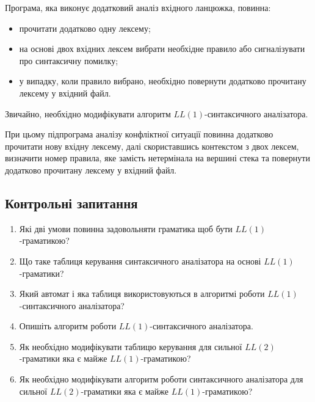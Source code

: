 Програма, яка виконує додатковий аналіз вхідного ланцюжка, повинна:
\begin{itemize}
	\item прочитати додатково одну лексему;
	\item на основі двох вхідних лексем вибрати необхідне правило або сигналізувати про синтаксичну помилку;
	\item у випадку, коли правило вибрано, необхідно повернути додатково прочитану лексему у вхідний файл.
\end{itemize}

Звичайно, необхідно модифікувати алгоритм $LL(1)$-синтаксичного аналізатора. \medskip

При цьому підпрограма аналізу конфліктної ситуації повинна додатково прочитати нову вхідну лексему, далі скориставшись контекстом з двох лексем, визначити номер правила, яке замість нетермінала на вершині стека та повернути додатково прочитану лексему у вхідний файл.

\subsection{Контрольні запитання}

\begin{enumerate}
	\item Які дві умови повинна задовольняти граматика щоб бути $LL(1)$-гра\-ма\-ти\-кою?
	\item Що таке таблиця керування синтаксичного аналізатора на основі $LL(1)$-гра\-ма\-ти\-ки?
	\item Який автомат і яка таблиця використовуються в алгоритмі роботи $LL(1)$-син\-так\-сич\-но\-го аналізатора? %
	\item Опишіть алгоритм роботи $LL(1)$-синтаксичного аналізатора.
	\item Як необхідно модифікувати таблицю керування для сильної $LL(2)$-гра\-ма\-ти\-ки яка є майже $LL(1)$-гра\-ма\-ти\-кою?
	\item Як необхідно модифікувати алгоритм роботи синтаксичного аналізатора для сильної $LL(2)$-гра\-ма\-ти\-ки яка є майже $LL(1)$-гра\-ма\-ти\-кою?
\end{enumerate}
